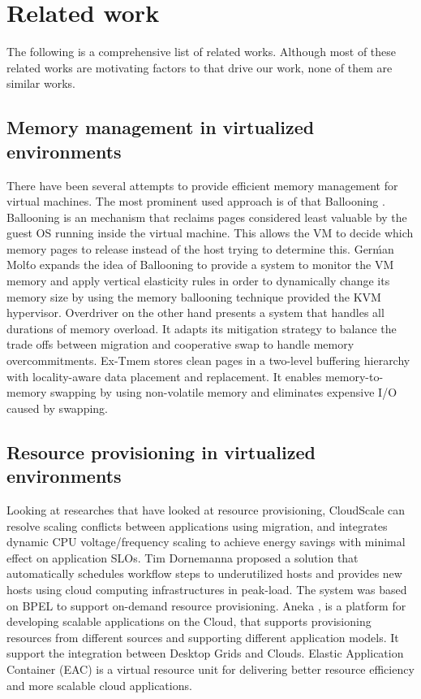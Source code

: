 
\chapter{Related work}
  The following is a comprehensive list of related works. Although most of these related works are motivating factors to that 
  drive our work, none of them are similar works.
  
  \section{Memory management in virtualized environments}
    There have been several attempts to provide efficient memory management for virtual machines. The most prominent used approach is of 
    that Ballooning \cite{waldspurger2002memory}. Ballooning is an mechanism that reclaims pages considered least valuable by the guest OS 
    running inside the virtual machine. This allows the VM to decide which memory pages to release instead of the host trying to determine this.
    Gerḿan Molt́o \cite{molto2013elastic} expands the idea of Ballooning to provide a system to monitor the VM memory and apply vertical 
    elasticity rules in order to dynamically change its memory size by using the memory ballooning technique provided the KVM hypervisor. 
    Overdriver \cite{williams2011overdriver} on the other hand presents a system that handles all durations of memory overload. It adapts its 
    mitigation strategy to balance the trade offs between migration and cooperative swap to handle memory overcommitments. Ex-Tmem 
    \cite{venkatesan2014ex} stores clean pages in a two-level buffering hierarchy with locality-aware data placement and replacement. It 
    enables memory-to-memory swapping by using non-volatile memory and eliminates expensive I/O caused by swapping.
  
  \section{Resource provisioning in virtualized environments}
    Looking at researches that have looked at resource provisioning, CloudScale \cite{shen2011cloudscale} can resolve scaling conflicts 
    between applications using migration, and integrates dynamic CPU voltage/frequency scaling to achieve energy savings with minimal effect on 
    application SLOs. Tim Dornemanna\cite{dornemann2009demand} proposed a solution that automatically schedules workflow steps to underutilized 
    hosts and provides new hosts using cloud computing infrastructures in peak-load. The system was based on BPEL to support on-demand resource 
    provisioning. Aneka \cite{calheiros2012aneka}, is a platform for developing scalable applications on the Cloud, that supports provisioning 
    resources from different sources and supporting different application models. It support the integration between Desktop Grids and Clouds. 
    Elastic Application Container (EAC) \cite{he2012elastic} is a virtual resource unit for delivering better resource efficiency and more 
    scalable cloud applications. 

